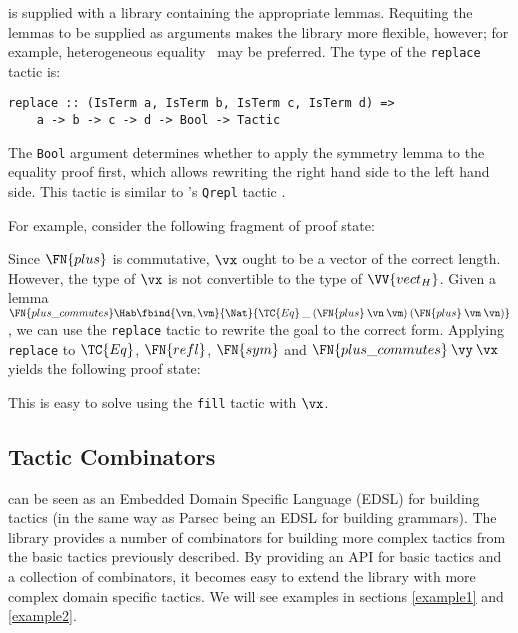 \Ivor{} is supplied with a library containing the appropriate
lemmas. Requiting the lemmas to be supplied as arguments makes the
library more flexible, however; for example, heterogeneous
equality~\cite{mcbride-thesis} may be preferred.
The type of the \texttt{replace} tactic is:

\begin{verbatim}
replace :: (IsTerm a, IsTerm b, IsTerm c, IsTerm d) =>
    a -> b -> c -> d -> Bool -> Tactic
\end{verbatim}

The \texttt{Bool} argument determines whether to apply the symmetry
lemma to the equality proof first, which allows rewriting the right
hand side to the left hand side. This  tactic is
similar to \Lego{}'s \texttt{Qrepl} tactic \cite{lego-manual}.

For example, consider the following fragment of proof state:


Since $\FN{plus}$ is commutative, $\vx$ ought to be a vector of the
correct length. However, the type of $\vx$ is not convertible to the
type of $\VV{vect_H}$. Given a lemma $\FN{plus\_commutes}\Hab
\fbind{\vn,\vm}{\Nat}{\TC{Eq}\:\_\:(\FN{plus}\:\vn\:\vm)\:(\FN{plus}\:\vm\:\vn)}$,
we can use the \texttt{replace} tactic to rewrite the goal to the
correct form. Applying \texttt{replace} to $\TC{Eq}$, $\FN{refl}$,
$\FN{sym}$ and $\FN{plus\_commutes}\:\vy\:\vx$ yields the following
proof state:


This is easy to solve using the \texttt{fill} tactic with $\vx$.

\subsection{Tactic Combinators}

\Ivor{} can be seen as an Embedded Domain Specific Language (EDSL) for
building tactics (in the same way as Parsec \cite{parsec} being an
EDSL for building grammars). The library provides a number of
combinators for building more complex tactics from the basic tactics
previously described. By providing an API for basic tactics and a
collection of combinators, it becomes easy to extend the library with
more complex domain specific tactics. We will see examples in
sections \ref{example1} and \ref{example2}.

